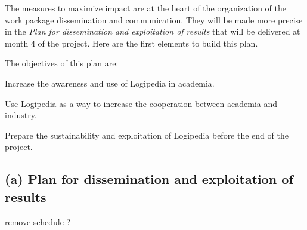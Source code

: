 The measures to maximize impact are at the heart of the organization
of the work package dissemination and communication. They will be made
more precise in the {\em Plan for dissemination and exploitation of
results} that will be delivered at month 4 of the project.
Here are the first elements to build this plan.

The objectives of this plan are:
\begin{compactitem}
\item Increase the awareness and use of Logipedia in academia.
\item Use Logipedia as a way to increase the cooperation between academia and
industry. 
\item Prepare the sustainability and exploitation of Logipedia before the
  end of the project.
\end{compactitem}


\subsection*{(a) Plan for dissemination and exploitation of results}
\label{sec:dissemination}

{\color{red} remove schedule ?}


